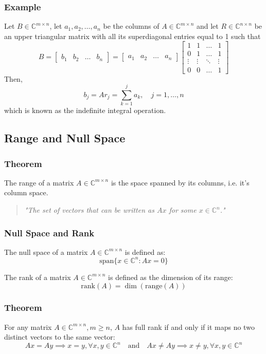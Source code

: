 \documentclass[11pt]{article}
\begin{document}
\subsubsection*{Example}
Let \( B \in \mathbb{C}^{m \times n} \), let \( a_1, a_2, \ldots, a_n \) be the columns of \( A \in \mathbb{C}^{m \times n} \) and let \( R \in \mathbb{C}^{n \times n} \) be an upper triangular matrix with all its superdiagonal entries equal to 1 such that
\[B = \begin{bmatrix}
    b_1 & b_2 & \dots & b_n
\end{bmatrix} = \begin{bmatrix}
    a_1 & a_2 & \dots & a_n
\end{bmatrix} \begin{bmatrix}
    1 & 1 & \dots & 1 \\
    0 & 1 & \dots & 1 \\
    \vdots & \vdots & \ddots & \vdots \\
    0 & 0 & \dots & 1
\end{bmatrix}\]
Then,
\[b_j = A r_j = \sum_{k=1}^{j} a_k, \quad j = 1, \ldots, n\] 
which is known as the indefinite integral operation.

\subsection{Range and Null Space}
\subsubsection*{Theorem}
The range of a matrix \( A \in \mathbb{C}^{m \times n} \) is the space spanned by its columns, i.e. it's column space.
\begin{quotation}
    \textit{"The set of vectors that can be written as \( Ax \) for some \( x \in \mathbb{C}^n \)."}
\end{quotation}

\subsubsection{Null Space and Rank}
The null space of a matrix \( A \in \mathbb{C}^{m \times n} \) is defined as:
\[\text{span} \{x \in \mathbb{C}^n : Ax = 0\}\]

The rank of a matrix \( A \in \mathbb{C}^{m \times n} \) is defined as the dimension of its range:
\[\text{rank}(A) = \dim(\text{range}(A))\]

\subsubsection*{Theorem}
For any matrix \( A \in \mathbb{C}^{m \times n}, m \geq n \), \( A \) has full rank if and only if it maps no two distinct vectors to the same vector:
\[Ax = Ay \implies x = y, \forall x, y \in \mathbb{C}^n \quad \text{and} \quad Ax \neq Ay \implies x \neq y, \forall x, y \in \mathbb{C}^n\]
\end{document}
